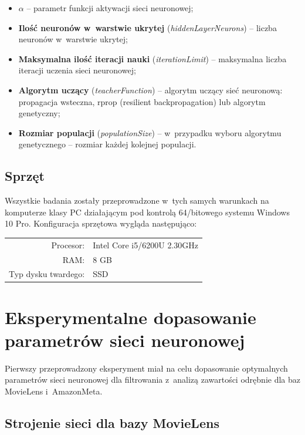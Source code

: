 \documentclass[twoside]{iisthesis}
\begin{document}
		 \begin{itemize}
		 	\item \textbf{$\alpha$} -- parametr funkcji aktywacji sieci neuronowej;
		 	\item \textbf{Ilość neuronów w~warstwie ukrytej} (\textit{hiddenLayerNeurons}) -- liczba neuronów w~warstwie ukrytej;
		 	\item \textbf{Maksymalna ilość iteracji nauki} (\textit{iterationLimit}) -- maksymalna liczba iteracji uczenia sieci neuronowej;
		 	\item \textbf{Algorytm uczący} (\textit{teacherFunction}) -- algorytm uczący sieć neuronową: propagacja wsteczna, rprop (resilient backpropagation) lub algorytm genetyczny;
		 	\item \textbf{Rozmiar populacji} (\textit{populationSize}) -- w~przypadku wyboru algorytmu genetycznego -- rozmiar każdej kolejnej populacji.
		 	
		 \end{itemize}	 
		
		\subsection{Sprzęt}
		
		Wszystkie badania zostały przeprowadzone w~tych samych warunkach na komputerze klasy PC działającym pod kontrolą 64\-/bitowego systemu Windows 10 Pro. Konfiguracja sprzętowa wygląda następująco:
		
		\begin{center}
			\begin{tabular}{ r  l  }
				Procesor: & Intel Core i5\-/6200U 2.30GHz \\ 
				RAM: & 8 GB \\  
				Typ dysku twardego: & SSD     
			\end{tabular}
		\end{center}
	
	\section{Eksperymentalne dopasowanie parametrów sieci neuronowej}
	
		Pierwszy przeprowadzony eksperyment miał na celu dopasowanie optymalnych parametrów sieci neuronowej dla filtrowania z~analizą zawartości odrębnie dla baz MovieLens i~AmazonMeta.
		
		\subsection{Strojenie sieci dla bazy MovieLens}
		\label{ss:strojeniemovielens}
\end{document}
